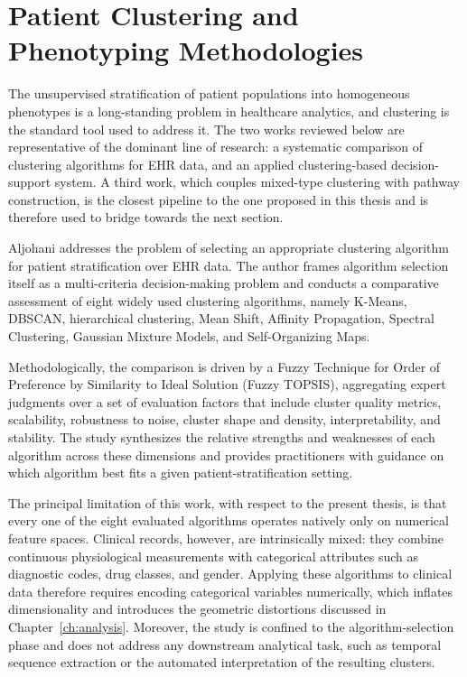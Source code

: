 \section{Patient Clustering and Phenotyping Methodologies}\label{sec:rw_clustering}

The unsupervised stratification of patient populations into homogeneous phenotypes is a long-standing problem in healthcare analytics, and clustering is the standard tool used to address it. The two works reviewed below are representative of the dominant line of research: a systematic comparison of clustering algorithms for EHR data, and an applied clustering-based decision-support system. A third work, which couples mixed-type clustering with pathway construction, is the closest pipeline to the one proposed in this thesis and is therefore used to bridge towards the next section.

Aljohani \cite{aljohani2024} addresses the problem of selecting an appropriate clustering algorithm for patient stratification over EHR data. The author frames algorithm selection itself as a multi-criteria decision-making problem and conducts a comparative assessment of eight widely used clustering algorithms, namely K-Means, DBSCAN, hierarchical clustering, Mean Shift, Affinity Propagation, Spectral Clustering, Gaussian Mixture Models, and Self-Organizing Maps.

Methodologically, the comparison is driven by a Fuzzy Technique for Order of Preference by Similarity to Ideal Solution (Fuzzy TOPSIS), aggregating expert judgments over a set of evaluation factors that include cluster quality metrics, scalability, robustness to noise, cluster shape and density, interpretability, and stability. The study synthesizes the relative strengths and weaknesses of each algorithm across these dimensions and provides practitioners with guidance on which algorithm best fits a given patient-stratification setting.

The principal limitation of this work, with respect to the present thesis, is that every one of the eight evaluated algorithms operates natively only on numerical feature spaces. Clinical records, however, are intrinsically mixed: they combine continuous physiological measurements with categorical attributes such as diagnostic codes, drug classes, and gender. Applying these algorithms to clinical data therefore requires encoding categorical variables numerically, which inflates dimensionality and introduces the geometric distortions discussed in Chapter~\ref{ch:analysis}. Moreover, the study is confined to the algorithm-selection phase and does not address any downstream analytical task, such as temporal sequence extraction or the automated interpretation of the resulting clusters.

